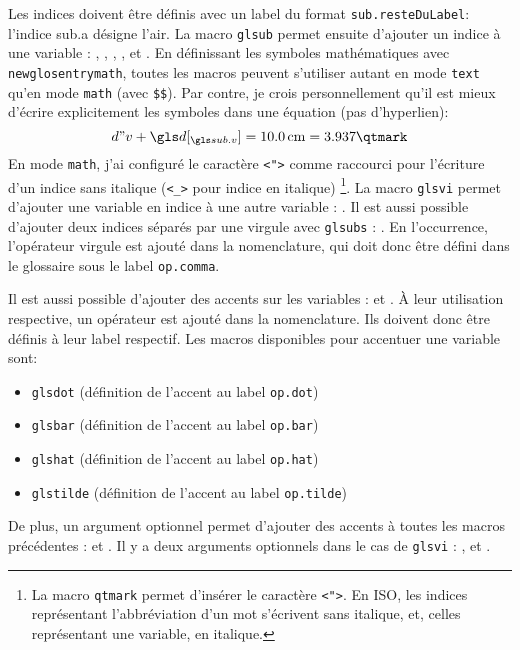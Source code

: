 \documentclass[PhD,nohyperref,english,french]{ulthese}
\begin{document}
Les indices doivent être définis avec un label du format \texttt{sub.resteDuLabel}: l'indice \gls{sub.a} désigne l'air. La macro \texttt{glsub} permet ensuite d'ajouter un indice à une variable : , , , ,  et . En définissant les symboles mathématiques avec \texttt{newglosentrymath}, toutes les macros peuvent s'utiliser autant en mode \texttt{text} qu'en mode \texttt{math} (avec \texttt{\$\$}). Par contre, je crois personnellement qu'il est mieux d'écrire explicitement les symboles dans une équation (pas d'hyperlien):
\begin{equation}
d"v + \glsub{d}{v} = \SI{10.0}{\centi\meter} = 3.937\qtmark
\end{equation}
En mode \texttt{math}, j'ai configuré le caractère \texttt{<">} comme raccourci pour l'écriture d'un indice sans italique (\texttt{<\_>} pour indice en italique) \footnote{ La macro \texttt{qtmark} permet d'insérer le caractère \texttt{<">}. En ISO, les indices représentant l'abbréviation d'un mot s'écrivent sans italique, et, celles représentant une variable, en italique.}. La macro \texttt{glsvi} permet d'ajouter une variable en indice à une autre variable : . Il est aussi possible d'ajouter deux indices séparés par une virgule avec \texttt{glsubs} : . En l’occurrence, l'opérateur virgule est ajouté dans la nomenclature, qui doit donc être défini dans le glossaire sous le label \texttt{op.comma}.

Il est aussi possible d'ajouter des accents sur les variables :  et . À leur utilisation respective, un opérateur est ajouté dans la nomenclature. Ils doivent donc être définis à leur label respectif. Les macros disponibles pour accentuer une variable sont:
\begin{itemize} 
	\item \texttt{glsdot} (définition de l'accent au label \texttt{op.dot})
	\item \texttt{glsbar} (définition de l'accent au label \texttt{op.bar})
	\item \texttt{glshat} (définition de l'accent au label \texttt{op.hat})
	\item \texttt{glstilde} (définition de l'accent au label \texttt{op.tilde})
\end{itemize}
De plus, un argument optionnel permet d'ajouter des accents à toutes les macros précédentes :  et . Il y a deux arguments optionnels dans le cas de \texttt{glsvi} : ,  et .
\end{document}

